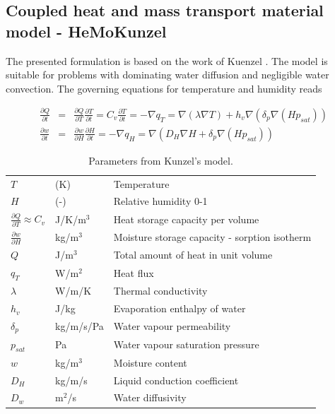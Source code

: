 \documentclass[a4paper]{article}
\newcommand{\bea}{\begin{eqnarray}}
\newcommand{\eea}{\end{eqnarray}}
\begin{document}
\clearpage
\subsection{Coupled heat and mass transport material model - HeMoKunzel}
The presented formulation is based on the work of Kuenzel \cite{Kuenzel}. 
The model is suitable for problems with dominating water diffusion
and negligible water convection. The governing equations for temperature and humidity reads

\bea
\frac{\partial Q}{\partial t} &=& \frac{\partial Q}{\partial T} \frac{\partial T}{\partial t} = C_v \frac{\partial T}{\partial t} = -\nabla q_T = \nabla \left( \lambda \nabla T \right ) + h_v \nabla \left( \delta_p \nabla (H p_{sat}) \right )\\
\frac{\partial w}{\partial t} &=& \frac{\partial w}{\partial H} \frac{\partial H}{\partial t} = -\nabla q_H = \nabla \left( D_H \nabla H + \delta_p \nabla (H p_{sat}) \right )
\eea 

\begin{table}[!htb]
\begin{center}
{\renewcommand{\arraystretch}{1.3}
\begin{tabular}{|l|l|l|}
\hline
$T$        &(K)         & Temperature\\
$H$        &(-)         & Relative humidity 0-1\\
\hline
$\frac{\partial Q}{\partial T} \approx C_v$ &J/K/m$^3$ & Heat storage capacity per volume\\
$\frac{\partial w}{\partial H}$ &kg/m$^3$ & Moisture storage capacity - sorption isotherm\\
$Q$        &J/m$^3$   & Total amount of heat in unit volume\\
$q_T$      &W/m$^2$   & Heat flux\\
$\lambda$  &W/m/K     & Thermal conductivity\\
$h_v$      &J/kg      & Evaporation enthalpy of water\\
$\delta_p$ &kg/m/s/Pa & Water vapour permeability\\
$p_{sat}$  &Pa        & Water vapour saturation pressure\\
$w$        &kg/m$^3$  & Moisture content\\
$D_H$      &kg/m/s    & Liquid conduction coefficient\\
$D_w$      &m$^2$/s   & Water diffusivity\\
\hline
\end{tabular}
}
\caption{Parameters from Kunzel's model.}
\end{center}
\end{table}
\end{document}
